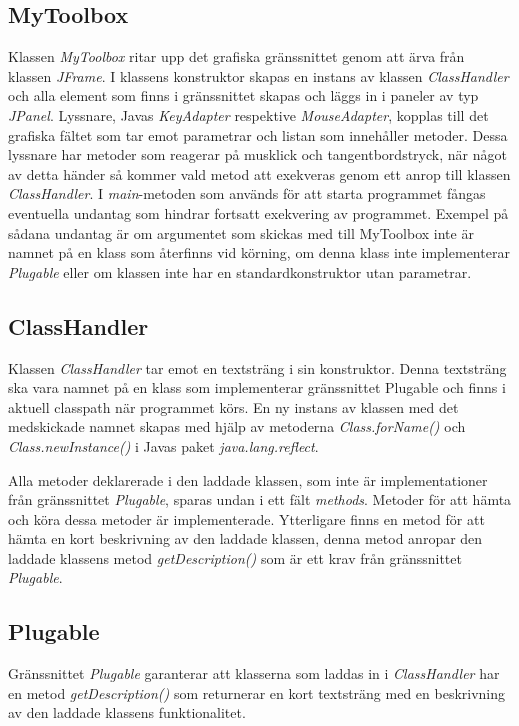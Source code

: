 \documentclass[a4paper, 12pt]{article}
\begin{document}
\subsection{MyToolbox}
Klassen \textit{MyToolbox} ritar upp det grafiska gränssnittet genom
att ärva från klassen \textit{JFrame}. I klassens konstruktor skapas
en instans av klassen \textit{ClassHandler} och alla element som finns
i gränssnittet skapas och läggs in i paneler av typ
\textit{JPanel}. Lyssnare, Javas \textit{KeyAdapter} respektive
\textit{MouseAdapter}, kopplas till det grafiska fältet som tar emot
parametrar och listan som innehåller metoder. Dessa lyssnare har
metoder som reagerar på musklick och tangentbordstryck, när något av
detta händer så kommer vald metod att exekveras genom ett anrop till
klassen \textit{ClassHandler}. I \textit{main}-metoden som används för
att starta programmet fångas eventuella undantag som hindrar fortsatt
exekvering av programmet. Exempel på sådana undantag är om argumentet
som skickas med till MyToolbox inte är namnet på en klass som
återfinns vid körning, om denna klass inte implementerar
\textit{Plugable} eller om klassen inte har en standardkonstruktor
utan parametrar.

\subsection{ClassHandler}
Klassen \textit{ClassHandler} tar emot en textsträng i sin
konstruktor. Denna textsträng ska vara namnet på en klass som
implementerar gränssnittet Plugable och finns i aktuell classpath när
programmet körs. En ny instans av klassen med det medskickade namnet
skapas med hjälp av metoderna \textit{Class.forName()} och
\textit{Class.newInstance()} i Javas paket \textit{java.lang.reflect}.

Alla metoder deklarerade i den laddade klassen, som inte är
implementationer från gränssnittet \textit{Plugable}, sparas undan i ett
fält \textit{methods}. Metoder för att hämta och köra dessa metoder är
implementerade. Ytterligare finns en metod för att hämta en kort
beskrivning av den laddade klassen, denna metod anropar den laddade
klassens metod \textit{getDescription()} som är ett krav från
gränssnittet \textit{Plugable}.

\subsection{Plugable}
Gränssnittet \textit{Plugable} garanterar att klasserna som laddas in i
\textit{ClassHandler} har en metod \textit{getDescription()} som
returnerar en kort textsträng med en beskrivning av den laddade
klassens funktionalitet.
\end{document}
